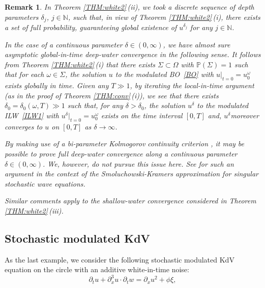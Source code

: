 \documentclass[letterpaper, 11pt,  reqno]{amsart}
\newtheorem{remark}[theorem]{Remark}
\newcommand{\1}{\hspace{0.5mm}\text{I}\hspace{0.5mm}}
\newcommand{\PP}{\mathbb{P}}
\newcommand{\dl}{\delta}
\newcommand{\Si}{\Sigma}
\newcommand{\dx}{\partial_x}
\newcommand{\dt}{\partial_t}
\renewcommand{\o}{\omega}
\renewcommand{\O}{\Omega}
\newcommand{\N}{\mathbb{N}}
\numberwithin{equation}{section}
\numberwithin{theorem}{section}
\begin{document}
\begin{remark}\rm
In Theorem \ref{THM:white2}\,(ii), 
we took a discrete sequence of depth parameters $\dl_j$, $j \in \N$,  
such that, in view of  
Theorem \ref{THM:white2}\,(i), 
there exists a set of full probability, 
guaranteeing global existence of 
$u^{\dl_j}$ for any  $j \in \N$.


In the case of  a continuous parameter $\dl \in (0, \infty)$, 
we have  almost sure asymptotic  global-in-time deep-water convergence
in the following sense.
It follows from Theorem \ref{THM:white2}\,(i)
that there exists  $\Si \subset \O$ with $\PP(\Si) = 1$
such that for each $\o \in \Si$, 
the solution $u$ 
to the modulated BO~\eqref{BO}
with $u|_{t= 0} = u_0^\o$
exists globally in time.
Given any $T \gg 1$, by iterating the local-in-time argument
(as in the proof of Theorem \ref{THM:conv}\,(i)), 
we see that there exists $\dl_ 0 = \dl_0(\o, T) \gg 1$
such that, for any $\dl > \dl_0$,  
the solution $u^{\dl}$ 
to the modulated ILW~\eqref{ILW1}
with $u^{\dl}|_{t= 0} = u_0^\o$
exists on the time interval $[0, T]$
and, $u^\dl $moreover converges to $u$ on $[0, T]$ as $\dl \to \infty$.


By making use of 
a bi-parameter Kolmogorov continuity criterion
\cite[Lemma 2.1]{Baldi}, 
it may be possible to prove full deep-water convergence
along a continuous parameter $\dl \in (0, \infty)$.
We, however, do not pursue this issue here.
See \cite{Zine} for such an argument
in the context of 
the Smoluchowski-Kramers approximation for singular stochastic
wave equations.


Similar comments apply to the shallow-water convergence
considered in 
 Theorem \ref{THM:white2}\,(iii).






\end{remark}







\subsection{Stochastic modulated KdV}
\label{SUBSEC:1.6}

As the last example, 
we consider 
the following stochastic modulated KdV equation on the circle
with an additive white-in-time noise:
\begin{equation}
\label{skdv1}
\dt u+  \dx^3 u \cdot \dt w =\dx u^2 + \phi \xi, 
\end{equation}
\end{document}
